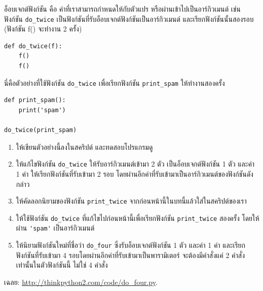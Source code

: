 \begin{exercise}

อ็อบเจกต์ฟังก์ชัน คือ ค่าที่เราสามารถกำหนดให้กับตัวแปร หรือผ่านเข้าไปเป็นอาร์กิวเมนต์
เช่น ฟังก์ชัน \verb"do_twice" เป็นฟังก์ชันที่รับอ็อบเจกต์ฟังก์ชันเป็นอาร์กิวเมนต์ และเรียกฟังก์ชันนั้นสองรอบ 
(ฟังก์ชัน f() จะทำงาน 2 ครั้ง)

\begin{verbatim}
def do_twice(f):
    f()
    f()
\end{verbatim}

นี่คือตัวอย่างที่ใช้ฟังก์ชัน \verb"do_twice" เพื่อเรียกฟังก์ชัน \verb|print_spam| ให้ทำงานสองครั้ง 

\begin{verbatim}
def print_spam():
    print('spam')

do_twice(print_spam)
\end{verbatim}

\begin{enumerate}

\item ให้เขียนตัวอย่างนี้ลงในสคริปต์ และทดสอบโปรแกรมดู

\item ให้แก้ไขฟังก์ชัน \verb"do_twice" ให้รับอาร์กิวเมนต์เข้ามา 2 ตัว เป็นอ็อบเจกต์ฟังก์ชัน 1 ตัว และค่า 1 ค่า
ให้เรียกฟังก์ชันที่รับเข้ามา 2 รอบ โดยผ่านอีกค่าที่รับเข้ามาเป็นอาร์กิวเมนต์ของฟังก์ชันดังกล่าว

\item ให้คัดลอกนิยามของฟังก์ชัน \verb|print_twice| จากก่อนหน้านี้ในบทนี้แล้วใส่ในสคริปต์ของเรา

\item ให้ใช้ฟังก์ชัน \verb"do_twice" ที่แก้ไขไปก่อนหน้านี้เพื่อเรียกฟังก์ชัน \verb|print_twice| สองครั้ง
โดยให้ผ่าน \verb"'spam'" เป็นอาร์กิวเมนต์

\item ให้นิยามฟังก์ชันใหม่ที่ชื่อว่า \verb"do_four" ซึ่งรับอ็อบเจกต์ฟังก์ชัน 1 ตัว และค่า 1 ค่า
และเรียกฟังก์ชันที่รับเข้ามา 4 รอบโดยผ่านอีกค่าที่รับเข้ามาเป็นพารามิเตอร์
จะต้องมีคำสั่งแค่ 2 คำสั่งเท่านั้นในตัวฟังก์ชันนี้ ไม่ใช่ 4 คำสั่ง

\end{enumerate}

เฉลย: \url{http://thinkpython2.com/code/do_four.py}.

\end{exercise}



